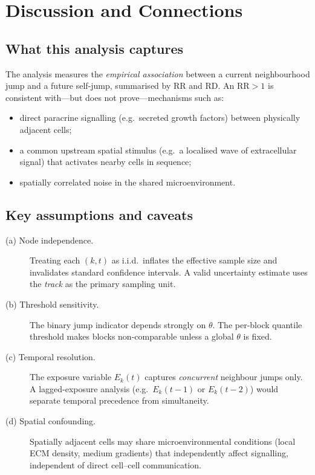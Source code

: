 \documentclass[11pt,a4paper]{article}
\theoremstyle{definition}
\theoremstyle{plain}
\newcommand{\expo}[2]{E_{#1}(#2)}
\newcommand{\RD}{\mathrm{RD}}
\newcommand{\RR}{\mathrm{RR}}
\newcommand{\1}[1]{\mathbf{1}\!\left[#1\right]}
\begin{document}
\section{Discussion and Connections}

\subsection{What this analysis captures}

The analysis measures the \emph{empirical association} between a current
neighbourhood jump and a future self-jump, summarised by $\RR$ and $\RD$.
An $\RR > 1$ is consistent with---but does not prove---mechanisms such as:
\begin{itemize}
  \item direct paracrine signalling (e.g.\ secreted growth factors) between
        physically adjacent cells;
  \item a common upstream spatial stimulus (e.g.\ a localised wave of
        extracellular signal) that activates nearby cells in sequence;
  \item spatially correlated noise in the shared microenvironment.
\end{itemize}

\subsection{Key assumptions and caveats}

\begin{description}
  \item[(a) Node independence.]
        Treating each $(k,t)$ as i.i.d.\ inflates the effective sample size
        and invalidates standard confidence intervals. A valid uncertainty
        estimate uses the \emph{track} as the primary sampling unit.

  \item[(b) Threshold sensitivity.]
        The binary jump indicator depends strongly on $\theta$.
        The per-block quantile threshold makes blocks non-comparable unless
        a global $\theta$ is fixed.

  \item[(c) Temporal resolution.]
        The exposure variable $\expo{k}{t}$ captures \emph{concurrent}
        neighbour jumps only.  A lagged-exposure analysis
        (e.g.\ $\expo{k}{t-1}$ or $\expo{k}{t-2}$) would separate
        temporal precedence from simultaneity.

  \item[(d) Spatial confounding.]
        Spatially adjacent cells may share microenvironmental conditions
        (local ECM density, medium gradients) that independently affect
        signalling, independent of direct cell--cell communication.
\end{description}
\end{document}
